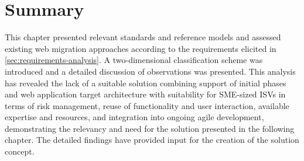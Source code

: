 \hypertarget{summary}{%
\section{Summary}\label{summary}}

This chapter presented relevant standards and reference models and assessed existing web migration approaches according to the requirements elicited in \cref{sec:requirements-analysis}.
A two-dimensional classification scheme was introduced and a detailed discussion of observations was presented.
This analysis has revealed the lack of a suitable solution combining support of initial phases and web application target architecture with suitability for SME-sized ISVs in terms of risk management, reuse of functionality and user interaction, available expertise and resources, and integration into ongoing agile development, demonstrating the relevancy and need for the solution presented in the following chapter.
The detailed findings have provided input for the creation of the solution concept.
